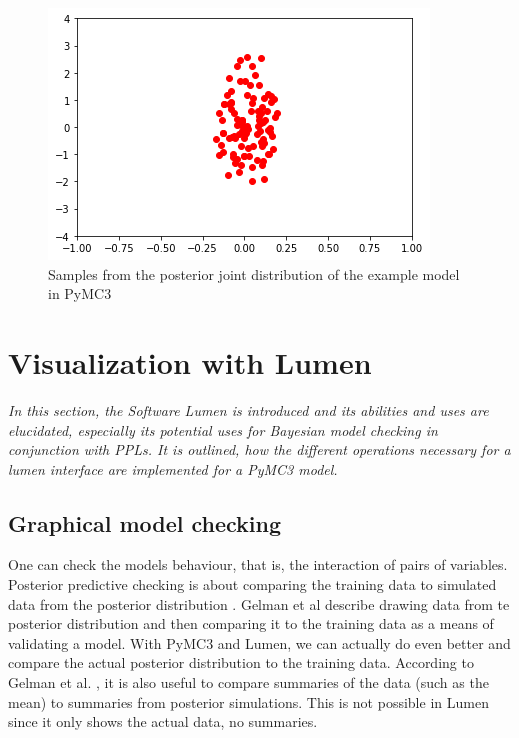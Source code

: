 \documentclass{article}
\begin{document}
\begin{figure}
	\includegraphics[width=\textwidth]{images/PyMC3_joint_posterior_samples_simple_model.png}
	\caption[Samples from the posterior joint distribution of the example model in PyMC3]{Samples from the posterior joint distribution of the example model in PyMC3}
	\label{fig:PyMC3_joint_posterior_samples_simple_model}
\end{figure}

\section{Visualization with Lumen}
\textit{In this section, the Software Lumen is introduced and its abilities and uses are elucidated, especially its potential uses for Bayesian model checking in conjunction with PPLs. It is outlined, how the different operations necessary for a lumen interface are implemented for a PyMC3 model.} 



\subsection{Graphical model checking}
One can check the models behaviour, that is, the interaction of pairs of variables.
Posterior predictive checking is about comparing the training data to simulated data from the posterior distribution \cite{1439840954}. 
Gelman et al \cite{1439840954} describe drawing data from te posterior distribution and then comparing it to the training data as a means of validating a model. With PyMC3 and Lumen, we can actually do even better and compare the actual posterior distribution to the training data.
According to Gelman et al.  \cite{1439840954}, it is also useful to compare summaries of the data (such as the mean) to summaries from posterior simulations. This is not possible in Lumen since it only shows the actual data, no summaries.
\end{document}
